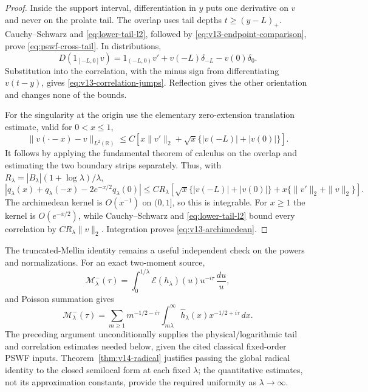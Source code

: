 \documentclass[11pt]{article}
\theoremstyle{remark}
\begin{document}
\begin{proof}
Inside the support interval, differentiation in $y$ puts one derivative
on $v$ and never on the prolate tail. The overlap uses tail depths
$t\ge(y-L)_+$. Cauchy--Schwarz and \eqref{eq:lower-tail-l2}, followed by
\eqref{eq:v13-endpoint-comparison}, prove
\eqref{eq:pswf-cross-tail}. In distributions,
\[
 D(1_{[-L,0]}v)=1_{(-L,0)}v'
       +v(-L)\delta_{-L}-v(0)\delta_0.
\]
Substitution into the correlation, with the minus sign from differentiating
$v(t-y)$, gives \eqref{eq:v13-correlation-jumps}. Reflection gives the
other orientation and changes none of the bounds.

For the singularity at the origin use the elementary zero-extension
translation estimate, valid for $0<x\le1$,
\begin{equation}\label{eq:v13-translation}
 \|v(\cdot-x)-v\|_{L^2(\mathbb R)}
 \le C\left[x\|v'\|_2
   +\sqrt{x}\{ |v(-L)|+|v(0)|\}\right].
\end{equation}
It follows by applying the fundamental theorem of calculus on the overlap
and estimating the two boundary strips separately. Thus, with
$R_\lambda=|B_\lambda|(1+\log\lambda)/\lambda$,
\[
 |q_\lambda(x)+q_\lambda(-x)-2e^{-x/2}q_\lambda(0)|
 \le C R_\lambda\left[
  \sqrt{x}\{|v(-L)|+|v(0)|\}
  +x\{\|v'\|_2+\|v\|_2\}\right].
\]
The archimedean kernel is $O(x^{-1})$ on $(0,1]$, so this is integrable.
For $x\ge1$ the kernel is $O(e^{-x/2})$, while Cauchy--Schwarz and
\eqref{eq:lower-tail-l2} bound every correlation by
$CR_\lambda\|v\|_2$. Integration proves
\eqref{eq:v13-archimedean}.
\end{proof}

The truncated-Mellin identity remains a useful independent check on the powers and normalizations.  For an exact two-moment source,
\begin{equation}\label{eq:truncated-mellin-tail}
 \mathcal M^-_\lambda(\tau)
 =\int_0^{1/\lambda}\mathcal E(h_\lambda)(u)u^{-i\tau}\,\frac{du}{u},
\end{equation}
and Poisson summation gives
\begin{equation}\label{eq:truncated-mellin-poisson}
 \mathcal M^-_\lambda(\tau)
 =\sum_{m\ge1}m^{-1/2-i\tau}
   \int_{m\lambda}^{\infty}\widehat h_\lambda(x)
   x^{-1/2+i\tau}\,dx.
\end{equation}
The preceding argument unconditionally supplies the physical/logarithmic
tail and correlation estimates needed below, given the cited classical
fixed-order PSWF inputs. Theorem~\ref{thm:v14-radical} justifies passing
the global radical identity to the closed semilocal form at each fixed
$\lambda$; the quantitative estimates, not its approximation constants,
provide the required uniformity as $\lambda\to\infty$.
\end{document}
